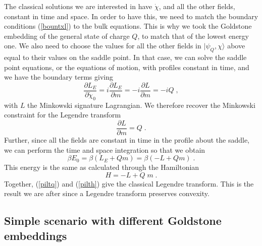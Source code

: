 \documentclass[11pt]{article}
\numberwithin{equation}{section}
\newcommand{\be}{\begin{equation}} \newcommand{\ee}{\end{equation}}
\begin{document}
The classical solutions we are interested in have $\dot{\chi}$, and all the other fields, constant in time and space. In order to have this, we need to match the boundary conditions (\ref{bountxl}) to the bulk equations. This is why we took the Goldstone embedding of the general state of charge $Q$, to match that of the lowest energy one. We also need to choose the values for all the other fields in $| \psi_Q,\chi  \rangle$ above equal to their values on the saddle point.
In that case, we can solve the saddle point equations, or the equations of motion, with profiles constant in time, and we have the boundary terms giving
\be
\frac{\partial L_E}{\partial \dot{\chi}_0} = i\frac{\partial L_E}{\partial m} = -i\frac{\partial L}{\partial m} = -i Q \;,
\ee
with $L$ the Minkowski signature Lagrangian. We therefore recover the Minkowski constraint for the Legendre transform
\be
\frac{\partial L}{\partial m} = Q \;.
\label{piltq}
\ee
Further, since all the fields are constant in time in the profile about the saddle, we can perform the time and space integration so that we obtain
\be
\beta E_0 = \beta \left( L_E + Q m \right) = \beta \left( -L + Q m \right) \;.
\ee
This energy is the same as calculated through the Hamiltonian
\be
H = -L + Q \;m  \;.
\label{pilth}
\ee
Together, (\ref{piltq}) and (\ref{pilth}) give the classical Legendre transform. This is the result we are after since a Legendre transform preserves convexity.


\subsection{Simple scenario with different Goldstone embeddings}
\label{sec:simsce}
\end{document}
